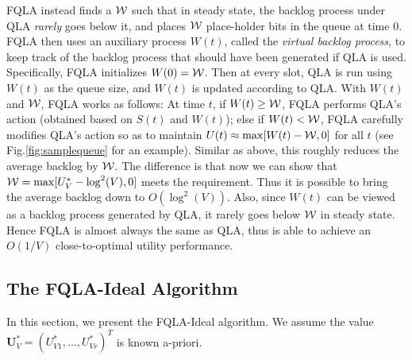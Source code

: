 \documentclass[journal]{IEEEtran}
\newcommand{\bv}[1]{{\boldsymbol{#1} }}
\newcommand{\script}[1]{{{\cal{#1} }}}
\begin{document}
FQLA instead finds a $\script{W}$ such that in steady state, the backlog process under QLA \emph{rarely} goes below it, and places $\script{W}$ place-holder bits in the queue at time $0$.  FQLA  then uses an auxiliary process $W(t)$, called the \emph{virtual backlog process}, to keep track of the backlog process that should have been generated if QLA is used. Specifically, FQLA initializes $W(0)=\script{W}$. Then at every  slot, QLA is run using $W(t)$ as the queue size, and $W(t)$ is updated according to QLA. With $W(t)$ and $\script{W}$, FQLA works as follows: At time $t$, if $W(t)\geq \script{W}$, FQLA performs QLA's action (obtained based on $S(t)$ and $W(t)$); else if $W(t)<\script{W}$, FQLA carefully modifies QLA's action so as to maintain $U(t)\approx\max[W(t)-\script{W},0]$ for all $t$ (see Fig.\ref{fig:samplequeue} for an example). 
Similar as above, this roughly reduces the average backlog by $\script{W}$. The difference is that now we can show that $\script{W}=\max[U^*_V-\log^2(V),0]$ meets the requirement. Thus it is possible to bring the average backlog down to $O(\log^2(V))$. Also, since $W(t)$ can be viewed as a backlog process generated by QLA, it rarely goes below $\script{W}$ in steady state. Hence FQLA is almost always the same as QLA, thus is able to achieve an $O(1/V)$ close-to-optimal utility performance. 


\subsection{The FQLA-Ideal Algorithm}
In this section, we present the FQLA-Ideal algorithm. We assume the value $\bv{U}^*_V=(U^*_{V1}, ..., U^*_{Vr})^T$ is known a-priori. 
 
\end{document}
